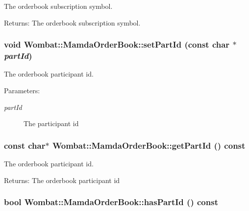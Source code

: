 The orderbook subscription symbol. 

\begin{Desc}
\item[Returns:]The orderbook subscription symbol. \end{Desc}
\hypertarget{classWombat_1_1MamdaOrderBook_4d600903da00215a31ee15fd5e3f462f}{
\subsubsection[setPartId]{\setlength{\rightskip}{0pt plus 5cm}void Wombat::Mamda\-Order\-Book::set\-Part\-Id (const char $\ast$ {\em part\-Id})}}
\label{classWombat_1_1MamdaOrderBook_4d600903da00215a31ee15fd5e3f462f}


The orderbook participant id. 

\begin{Desc}
\item[Parameters:]
\begin{description}
\item[{\em part\-Id}]The participant id \end{description}
\end{Desc}
\hypertarget{classWombat_1_1MamdaOrderBook_f7cd8457407380b1299466ba3e142bad}{
\subsubsection[getPartId]{\setlength{\rightskip}{0pt plus 5cm}const char$\ast$ Wombat::Mamda\-Order\-Book::get\-Part\-Id () const}}
\label{classWombat_1_1MamdaOrderBook_f7cd8457407380b1299466ba3e142bad}


The orderbook participant id. 

\begin{Desc}
\item[Returns:]The orderbook participant id \end{Desc}
\hypertarget{classWombat_1_1MamdaOrderBook_967fe8850a71364c5fef5e119d0d39a6}{
\subsubsection[hasPartId]{\setlength{\rightskip}{0pt plus 5cm}bool Wombat::Mamda\-Order\-Book::has\-Part\-Id () const}}
\label{classWombat_1_1MamdaOrderBook_967fe8850a71364c5fef5e119d0d39a6}


